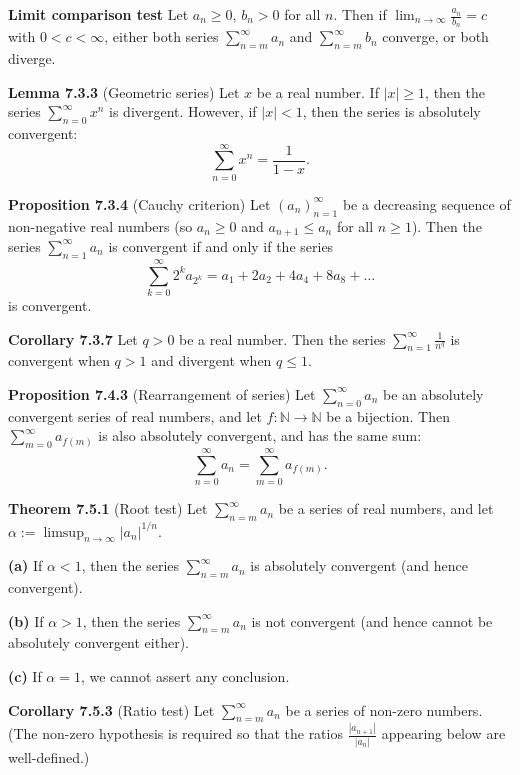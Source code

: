 \documentclass{article}
\begin{document}
\medskip

\textbf{Limit comparison test}
Let $a_n \geq 0$, $b_n > 0$ for all $n$. Then if
$\lim_{n \to \infty} \frac{a_n}{b_n} = c$ with $0 < c < \infty$,
either both series $\sum_{n=m}^{\infty} a_n$ and
$\sum_{n=m}^{\infty} b_n$ converge, or both diverge.

\medskip

\textbf{Lemma 7.3.3} (Geometric series) Let $x$ be a real number.
If $|x| \geq 1$, then the series $\sum_{n=0}^{\infty} x^n$ is divergent.
However, if $|x| < 1$, then the series is absolutely convergent:
\[
    \sum_{n=0}^{\infty} x^n = \frac{1}{1 - x}.
\]

\medskip

\textbf{Proposition 7.3.4} (Cauchy criterion) Let $(a_n)_{n=1}^{\infty}$ be a
decreasing sequence of non-negative real numbers (so $a_n \geq 0$ and
$a_{n+1} \leq a_n$ for all $n \geq 1$).
Then the series $\sum_{n=1}^{\infty} a_n$ is convergent if and only if the
series
\[
    \sum_{k=0}^{\infty} 2^k a_{2^k} = a_1 + 2a_2 + 4a_4 + 8a_8 + \dots
\]
is convergent.

\medskip

\textbf{Corollary 7.3.7} Let $q > 0$ be a real number. Then the series
$\sum_{n=1}^{\infty} \frac{1}{n^q}$ is convergent when $q > 1$ and divergent
when $q \leq 1$.

\medskip

\textbf{Proposition 7.4.3} (Rearrangement of series) Let $\sum_{n=0}^{\infty} a_n$
be an absolutely convergent series of real numbers, and let $f: \mathbb{N} \to \mathbb{N}$
be a bijection.
Then $\sum_{m=0}^{\infty} a_{f(m)}$ is also absolutely convergent, and has the
same sum:
\[
    \sum_{n=0}^{\infty} a_n = \sum_{m=0}^{\infty} a_{f(m)}.
\]

\medskip


\textbf{Theorem 7.5.1} (Root test) Let $\sum_{n=m}^{\infty} a_n$ be a series of real
numbers, and let $\alpha := \limsup_{n \to \infty} |a_n|^{1/n}$.

\textbf{(a)} If $\alpha < 1$, then the series $\sum_{n=m}^{\infty} a_n$ is absolutely
convergent (and hence convergent).

\textbf{(b)} If $\alpha > 1$, then the series $\sum_{n=m}^{\infty} a_n$ is not
convergent (and hence cannot be absolutely convergent either).

\textbf{(c)} If $\alpha = 1$, we cannot assert any conclusion.


\medskip


\textbf{Corollary 7.5.3} (Ratio test) Let $\sum_{n=m}^{\infty} a_n$ be a series of
non-zero numbers. (The non-zero hypothesis is required so that the ratios
$\frac{|a_{n+1}|}{|a_n|}$ appearing below are well-defined.)
\end{document}
